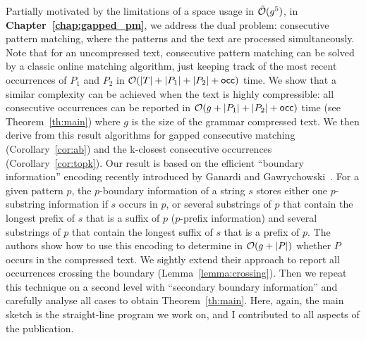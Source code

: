 Partially motivated by the limitations of a space usage in $\tilde {\mathcal{O}}(g^5)$, in \textbf{Chapter~\ref{chap:gapped_pm}}, we address the dual problem: consecutive pattern matching, where the patterns and the text are processed simultaneously. Note that for an uncompressed text, consecutive pattern matching can be solved by a classic online matching algorithm, just keeping track of the most recent occurrences of $P_1$ and $P_2$ in $\mathcal{O}(|T|+|P_1|+|P_2|+\mathsf{occ})$ time.
We show that a similar complexity can be achieved when the text is highly compressible: all consecutive occurrences can be reported in $\mathcal{O}(g+|P_1|+|P_2|+\mathsf{occ})$ time (see Theorem~\ref{th:main}) where $g$ is the size of the grammar compressed text. We then derive from this result algorithms for gapped consecutive matching (Corollary~\ref{cor:ab}) and the k-closest consecutive occurrences (Corollary~\ref{cor:topk}).
Our result is based on the efficient ``boundary information'' encoding recently introduced by Ganardi and Gawrychowski~\cite{DBLP:conf/soda/GanardiG22}. For a given pattern $p$, the $p$-boundary information of a string $s$ stores either one $p$-substring information if $s$ occurs in $p$, or several substrings of $p$ that contain the longest prefix of $s$ that is a suffix of $p$ ($p$-prefix information) and several substrings of $p$ that contain the longest suffix of $s$ that is a prefix of $p$. The authors show how to use this encoding to determine in $\mathcal{O}(g+|P|)$ whether $P$ occurs in the compressed text. We sightly extend their approach to report all occurrences crossing the boundary (Lemma~\ref{lemma:crossing}). Then we repeat this technique on a second level with ``secondary boundary information'' and carefully analyse all cases to obtain Theorem~\ref{th:main}. Here, again, the main sketch is the straight-line program we work on, and I contributed to all aspects of the publication.

